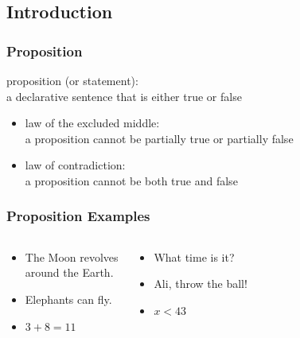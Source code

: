 \documentclass[dvipsnames]{beamer}
\begin{document}
\subsection{Introduction}

\begin{frame}
  \frametitle{Proposition}

  \begin{definition}
    \alert{proposition} (or \alert{statement}):\\
      a declarative sentence that is either true or false
  \end{definition}

  \pause
  \begin{itemize}
    \item \alert{law of the excluded middle}:\\
      a proposition cannot be partially true or partially false
  \end{itemize}

  \pause
  \begin{itemize}
    \item \alert{law of contradiction}:\\
      a proposition cannot be both true and false
  \end{itemize}
\end{frame}

\begin{frame}
  \frametitle{Proposition Examples}

  \begin{columns}[t]
    \begin{example}[proposition]
      \begin{itemize}
        \item The Moon revolves\\
          around the Earth.
        \item Elephants can fly.
        \item $3+8=11$
      \end{itemize}
    \end{example}

    \pause
    \begin{example}
      \begin{itemize}
        \item What time is it?
        \item Ali, throw the ball!
        \item $x<43$
      \end{itemize}
    \end{example}
  \end{columns}
\end{frame}
\end{document}
